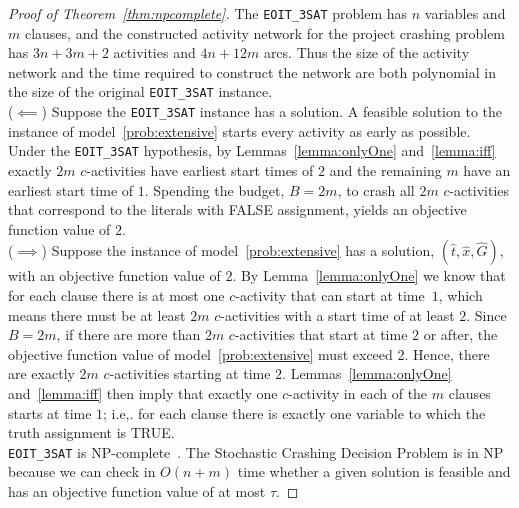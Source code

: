 \documentclass[11pt]{article}
\newcommand{\tcb}{\textcolor{blue}}
\begin{document}
	\begin{proof}[Proof of Theorem~\ref{thm:npcomplete}]
		The \verb|EOIT_3SAT| problem has \(n\) variables and \(m\) clauses, and the constructed activity network for the project crashing problem has $3n + 3m + 2$ activities and \(4n + 12m\)
		arcs. Thus the size of the activity network and the time required to construct the network are both polynomial in the size of the original \verb|EOIT_3SAT| instance. \\
		{(\(\impliedby\))} Suppose the \verb|EOIT_3SAT| instance has a solution. A feasible solution to the instance of model~\eqref{prob:extensive} starts every activity as early as possible. Under the \verb|EOIT_3SAT| hypothesis, by Lemmas~\ref{lemma:onlyOne} and~\ref{lemma:iff} exactly $2m$ $c$-activities have earliest start times of $2$ and the remaining $m$ have an earliest start time of $1$. Spending the budget, $B=2m$, to crash all $2m$ \(c\)-activities that correspond to the literals with FALSE assignment, yields an objective function value of \(2\). \\
		{(\(\implies\))} Suppose the instance of model~\eqref{prob:extensive} has a solution, \((\hat{t},\hat{x},\hat{G})\), with an objective function value of $2$. By Lemma~\ref{lemma:onlyOne} we know that for each clause there is at most one \(c\)-activity that can start at time~\(1\), which means there must be at least \(2m\) \(c\)-activities with a start time of at least $2$. Since $B=2m$, if there are more than \(2m\) \(c\)-activities that start at time \(2\) or after, the objective function value of model~\eqref{prob:extensive} must exceed 2. Hence, there are exactly \(2m\) \(c\)-activities starting at time \(2\). Lemmas~\ref{lemma:onlyOne} and~\ref{lemma:iff} then imply that exactly one \(c\)-activity in each of the \(m\) clauses starts at time \(1\); i.e,. for each clause there is exactly one variable to which the truth assignment is TRUE.\\
		\newline
		\verb|EOIT_3SAT| is NP-complete~\citep{Garey1979ComputersAI}. The {\sc Stochastic Crashing Decision Problem} is in NP because we can check in {\(O(n+m)\)} time whether a given solution is feasible and has an objective function value of at most $\tau$. %
	\end{proof}
	
\end{document}

